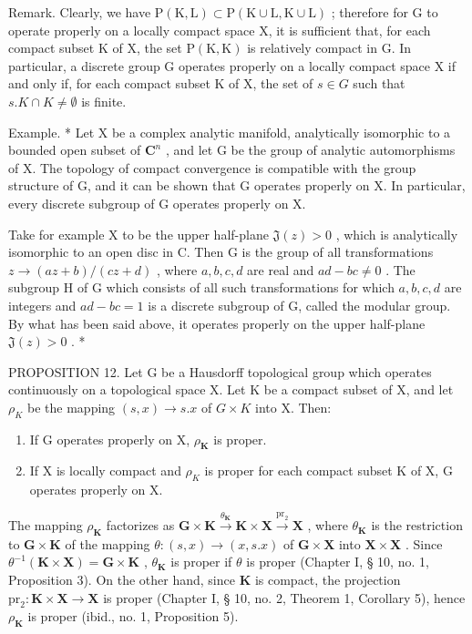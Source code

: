 Remark. Clearly, we have \(\mathrm{P}(\mathrm{K},\mathrm{L})\subset\mathrm{P}(\mathrm{K}\cup\mathrm{L},\mathrm{K}\cup\mathrm{L})\) ; therefore for G to operate properly on a locally compact space X, it is sufficient that, for each compact subset K of X, the set \(\mathrm{P}(\mathrm{K},\mathrm{K})\) is relatively compact in G. In particular, a discrete group G operates properly on a locally compact space X if and only if, for each compact subset K of X, the set of \(s\in G\) such that \(s.K\cap K\neq\emptyset\) is finite.

Example. * Let X be a complex analytic manifold, analytically isomorphic to a bounded open subset of \(\mathbf{C}^n\) , and let G be the group of analytic automorphisms of X. The topology of compact convergence is compatible with the group structure of G, and it can be shown that G operates properly on X. In particular, every discrete subgroup of G operates properly on X.

Take for example X to be the upper half-plane \(\mathfrak{J}(z)>0\) , which is analytically isomorphic to an open disc in C. Then G is the group of all transformations \(z\to (az+b)/(cz+d)\) , where \(a,b,c,d\) are real and \(ad-bc\neq0\) . The subgroup H of G which consists of all such transformations for which \(a,b,c,d\) are integers and \(ad-bc=1\) is a discrete subgroup of G, called the modular group. By what has been said above, it operates properly on the upper half-plane \(\mathfrak{J}(z)>0\) . *

PROPOSITION 12. Let G be a Hausdorff topological group which operates continuously on a topological space X. Let K be a compact subset of X, and let \(\rho_{K}\) be the mapping \((s, x) \to s.x\) of \(G \times K\) into X. Then:

\begin{enumerate}
\def\labelenumi{\alph{enumi})}
\item
  If G operates properly on X, \(\rho_{\mathbf{K}}\) is proper.
\item
  If X is locally compact and \(\rho_{K}\) is proper for each compact subset K of X, G operates properly on X.
\end{enumerate}

The mapping \(\rho_{\mathbf{K}}\) factorizes as \(\mathbf{G} \times \mathbf{K} \xrightarrow{\theta_{\mathbf{K}}} \mathbf{K} \times \mathbf{X} \xrightarrow{\mathrm{pr}_2} \mathbf{X}\) , where \(\theta_{\mathbf{K}}\) is the restriction to \(\mathbf{G} \times \mathbf{K}\) of the mapping \(\theta: (s, x) \to (x, s.x)\) of \(\mathbf{G} \times \mathbf{X}\) into \(\mathbf{X} \times \mathbf{X}\) . Since \(\theta^{-1}(\mathbf{K} \times \mathbf{X}) = \mathbf{G} \times \mathbf{K}\) , \(\theta_{\mathbf{K}}\) is proper if \(\theta\) is proper (Chapter I, § 10, no. 1, Proposition 3). On the other hand, since \(\mathbf{K}\) is compact, the projection \(\mathrm{pr}_2: \mathbf{K} \times \mathbf{X} \to \mathbf{X}\) is proper (Chapter I, § 10, no. 2, Theorem 1, Corollary 5), hence \(\rho_{\mathbf{K}}\) is proper (ibid., no. 1, Proposition 5).

